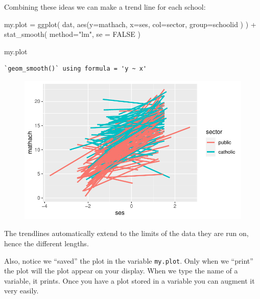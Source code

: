 \documentclass[
  letterpaper,
  DIV=11,
  numbers=noendperiod]{scrreprt}
\newenvironment{Shaded}{\begin{snugshade}}{\end{snugshade}}
\newcommand{\AttributeTok}[1]{\textcolor[rgb]{0.49,0.56,0.16}{#1}}
\newcommand{\ConstantTok}[1]{\textcolor[rgb]{0.53,0.00,0.00}{#1}}
\newcommand{\FunctionTok}[1]{\textcolor[rgb]{0.02,0.16,0.49}{#1}}
\newcommand{\NormalTok}[1]{\textcolor[rgb]{0.00,0.44,0.13}{#1}}
\newcommand{\OtherTok}[1]{\textcolor[rgb]{0.00,0.44,0.13}{#1}}
\newcommand{\SpecialCharTok}[1]{\textcolor[rgb]{0.25,0.44,0.63}{#1}}
\newcommand{\StringTok}[1]{\textcolor[rgb]{0.25,0.44,0.63}{#1}}
\begin{document}
Combining these ideas we can make a trend line for each school:

\begin{Shaded}
\begin{Highlighting}[]
\NormalTok{my.plot }\OtherTok{=} \FunctionTok{ggplot}\NormalTok{( dat, }\FunctionTok{aes}\NormalTok{(}\AttributeTok{y=}\NormalTok{mathach, }\AttributeTok{x=}\NormalTok{ses, }\AttributeTok{col=}\NormalTok{sector, }\AttributeTok{group=}\NormalTok{schoolid ) ) }\SpecialCharTok{+} 
    \FunctionTok{stat\_smooth}\NormalTok{( }\AttributeTok{method=}\StringTok{"lm"}\NormalTok{, }\AttributeTok{se =} \ConstantTok{FALSE}\NormalTok{ )}

\NormalTok{my.plot}
\end{Highlighting}
\end{Shaded}

\begin{verbatim}
`geom_smooth()` using formula = 'y ~ x'
\end{verbatim}

\begin{figure}[H]

{\centering \includegraphics{intro_ggplot_files/figure-pdf/unnamed-chunk-6-1.pdf}

}

\end{figure}

The trendlines automatically extend to the limits of the data they are
run on, hence the different lengths.

Also, notice we ``saved'' the plot in the variable \texttt{my.plot}.
Only when we ``print'' the plot will the plot appear on your display.
When we type the name of a variable, it prints. Once you have a plot
stored in a variable you can augment it very easily.
\end{document}

